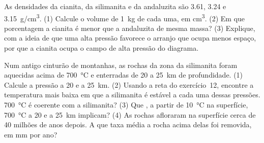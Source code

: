 \begin{exercise}[$\star\star\star$]\label{exo:g12:metamorphic-rocks:14}
As densidades da cianita, da silimanita e da andaluzita são \num{3.61},
\num{3.24} e \qty{3.15}{g/cm^3}. (1) Calcule o volume de \qty{1}{kg} de
cada uma, em \unit{cm^3}. (2) Em que porcentagem a cianita é menor que a
andaluzita de mesma massa? (3) Explique, com a ideia de que uma alta pressão
favorece o arranjo que ocupa menos espaço, por que a cianita ocupa o campo
de alta pressão do diagrama.
\end{exercise}

\begin{exercise}[$\star\star\star$]\label{exo:g12:metamorphic-rocks:15}
Num antigo cinturão de montanhas, as rochas da zona da silimanita foram
aquecidas acima de \qty{700}{\celsius} e enterradas de 20 a \qty{25}{km} de
profundidade. (1) Calcule a pressão a 20 e a \qty{25}{km}. (2) Usando a
reta do exercício~12, encontre a temperatura mais baixa em que a silimanita é
estável a cada uma dessas pressões. \qty{700}{\celsius} é coerente com a
silimanita? (3) Que , a partir de \qty{10}{\celsius}
na superfície, \qty{700}{\celsius} a 20 e a \qty{25}{km} implicam? (4) As
rochas afloraram na superfície cerca de 40 milhões de anos depois. A que
taxa média a rocha acima delas foi removida, em \unit{mm} por ano?
\end{exercise}

